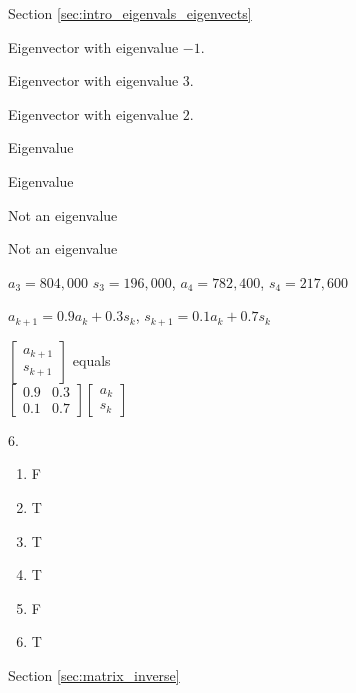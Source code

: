 \begin{multicols}{2}
\ee

\hspace{-0.25in} Section \ref{sec:intro_eigenvals_eigenvects}

\obe
\item
\ba
\item Eigenvector with eigenvalue $-1$.
\item Eigenvector with eigenvalue $3$. 
\item Eigenvector with eigenvalue $2$. 
\ea

\item 
\ba
\item Eigenvalue 
\item Eigenvalue
\item Not an eigenvalue
\item Not an eigenvalue
\ea


\item 
\ba
\item $a_3 = 804,000$ $s_3= 196,000$,  $a_4  = 782,400$, $s_4 = 217,600$
\item $a_{k+1}=0.9a_k+0.3s_k$, $s_{k+1}=0.1a_k+0.7s_k$
\item $\left[ \begin{array}{c} a_{k+1} \\ s_{k+1} \end{array} \right]$ equals \\
$\left[ \begin{array}{cc} 0.9 & 0.3 \\ 0.1 & 0.7\end{array} \right]  \left[ \begin{array} {c} a_k \\ s_k \end{array}\right]$
\ea

\oee

\be
\item[6.] 
\begin{enumerate}[label=(\alph*), leftmargin=1\parindent]
\item  F
\item T
\item T
\item T
\item F
\item T
\end{enumerate}

\ee

\hspace{-0.25in} Section \ref{sec:matrix_inverse}


\end{multicols}
